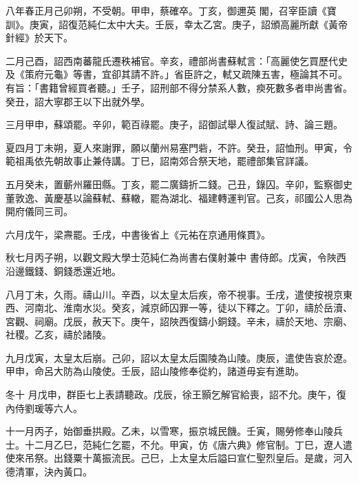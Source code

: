 \begin{pinyinscope}
 八年春正月己卯朔，不受朝。甲申，蔡確卒。丁亥，御邇英
 閣，召宰臣讀《寶訓》。庚寅，詔復范純仁太中大夫。壬辰，幸太乙宮。庚子，詔頒高麗所獻《黃帝針經》於天下。



 二月己酉，詔西南蕃龍氏遷秩補官。辛亥，禮部尚書蘇軾言：「高麗使乞買歷代史及《策府元龜》等書，宜卻其請不許。」省臣許之，軾又疏陳五害，極論其不可。有旨：「書籍曾經買者聽。」壬子，詔刑部不得分禁系人數，瘐死數多者申尚書省。癸丑，詔大寧郡王以下出就外學。



 三月甲申，蘇頌罷。辛卯，範百祿罷。庚子，詔御試舉人復試賦、詩、論三題。



 夏四月丁未朔，夏人來謝罪，願以蘭州易塞門砦，不許。癸丑，詔恤刑。甲寅，令範祖禹依先朝故事止兼侍講。丁巳，詔南郊合祭天地，罷禮部集官詳議。



 五月癸未，置蘄州羅田縣。丁亥，罷二廣鑄折二錢。己丑，錄囚。辛卯，監察御史董敦逸、黃慶基以論蘇軾、蘇轍，罷為湖北、福建轉運判官。己亥，祁國公人思為開府儀同三司。



 六月戊午，梁燾罷。壬戌，中書後省上《元祐在京通用條貫》。



 秋七月丙子朔，以觀文殿大學士范純仁為尚書右僕射兼中
 書侍郎。戊寅，令陜西沿邊鐵錢、銅錢悉還近地。



 八月丁未，久雨。禱山川。辛酉，以太皇太后疾，帝不視事。壬戌，遣使按視京東西、河南北、淮南水災。癸亥，減京師囚罪一等，徒以下釋之。丁卯，禱於岳瀆、宮觀、祠廟。戊辰，赦天下。庚午，詔陜西復鑄小銅錢。辛未，禱於天地、宗廟、社稷。乙亥，禱於諸陵。



 九月戊寅，太皇太后崩。己卯，詔以太皇太后園陵為山陵。庚辰，遣使告哀於遼。甲申，命呂大防為山陵使。壬辰，詔山陵修奉從約，諸道毋妄有進助。



 冬十
 月戊申，群臣七上表請聽政。戊辰，徐王顥乞解官給喪，詔不允。庚午，復內侍劉瑗等六人。



 十一月丙子，始御垂拱殿。乙未，以雪寒，振京城民饑。壬寅，賜勞修奉山陵兵士。十二月乙巳，范純仁乞罷，不允。甲寅，仿《唐六典》修官制。丁巳，遼人遣使來吊祭。出錢粟十萬振流民。己巳，上太皇太后謚曰宣仁聖烈皇后。是歲，河入德清軍，決內黃口。



\end{pinyinscope}